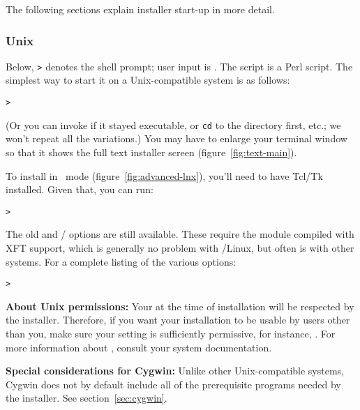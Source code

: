 \documentclass{article}
\begin{document}
The following sections explain installer start-up in more detail.

\subsubsection{Unix}

Below, \texttt{>} denotes the shell prompt; user input is
.
The script  is a Perl script.  The simplest way
to start it on a Unix-compatible system is as follows:
\begin{alltt}
> 
\end{alltt}
(Or you can invoke  if it stayed
executable, or \texttt{cd} to the directory first, etc.; we won't repeat
all the variations.)  You may have to enlarge your terminal window so
that it shows the full text installer screen
(figure~\ref{fig:text-main}).

To install in \GUI\ mode (figure~\ref{fig:advanced-lnx}), you'll need to
have Tcl/Tk installed.  Given that, you can run:
\begin{alltt}
> 
\end{alltt}

The old  and / options are still
available. These require the  module compiled with XFT
support, which is generally no problem with \GNU/Linux, but often is
with other systems. For a complete listing of the various options:
\begin{alltt}
> 
\end{alltt}

\textbf{About Unix permissions:} Your  at the time
of installation will be respected by the \TL{} installer.  Therefore, if
you want your installation to be usable by users other than you, make
sure your setting is sufficiently permissive, for instance, .  For more information about , consult your system
documentation.

\textbf{Special considerations for Cygwin:} Unlike other
Unix-compatible systems, Cygwin does not by default include all of the
prerequisite programs needed by the \TL{} installer.  See
section~\ref{sec:cygwin}.


\subsubsection{\MacOSX}
\label{sec:macosx}
\end{document}

